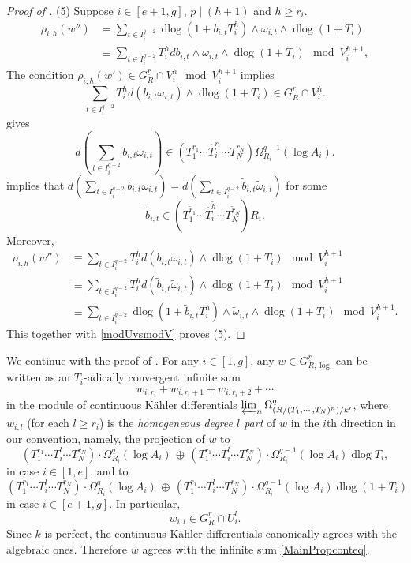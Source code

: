 \documentclass[11pt]{amsart}
\newcommand{\eq}[2]{\begin{equation}\label{#1}#2 \end{equation}}
\renewcommand{\lim}{\operatornamewithlimits{\varprojlim}}
\newcommand{\dlog}{\operatorname{dlog}}
\renewcommand{\hat}{\widehat}
\newcommand{\ul}{\underline}
\renewcommand{\tilde}{\widetilde}
\theoremstyle{plain}
\theoremstyle{definition}
\numberwithin{equation}{prop}
\begin{document}
\begin{proof}[Proof of ]
\vspace{0.5em}
(5)
Suppose $i\in [e+1,g]$,  $p\mid (h+1)$ and $h\ge r_i$.
\begin{align*} 
\rho_{i,h}(w'')
&=
\sum_{t\in I_i^{q-2}} 
\dlog(1+b_{i,t}T_i^{h})\wedge\omega_{i,t}
\wedge \dlog (1+T_i)
\\
&\equiv
\sum_{t\in I_i^{q-2}} 
T_i^{h}db_{i,t}\wedge\omega_{i,t}
\wedge \dlog (1+T_i)
\mod V_i^{h+1},
\end{align*}
The condition
$\rho_{i,h}(w')\in G_R^{\ul r}\cap V_i^{h}\mod V_i^{h+1}$ implies 
$$\sum_{t\in I_i^{q-2}} 
T_i^{h}d(b_{i,t}\omega_{i,t})
\wedge \dlog (1+T_i)
\in G_R^{\ul r}\cap V_i^{h}.$$
 gives
\eq{lem4(5)-1}{
d(\sum_{t\in I_i^{q-2}} b_{i,t}\omega_{i,t})
\in (T_1^{r_1}\cdots\hat T_i^{r_i}\cdots  T_N^{r_N})\Omega^{q-1}_{R_i}(\log A_i).}
 implies that $d(\sum_{t\in I_i^{q-2}} b_{i,t}\omega_{i,t})=d(\sum_{t\in I_i^{q-2}} \tilde b_{i,t}\tilde \omega_{i,t})$ for some 
$$\tilde b_{i,t}\in 
(T_1^{\tilde r_1}\cdots\hat T_i^{\tilde h}\cdots T_N^{\tilde r_N}) R_i.
$$
Moreover,
\begin{align*} 
\rho_{i,h}(w'')&
\equiv
\sum_{t\in I_i^{q-2}} 
T_i^{h}d(b_{i,t}\omega_{i,t})
\wedge \dlog (1+T_i)
\mod V_i^{h+1}
\\
&\equiv
\sum_{t\in I_i^{q-2}} 
T_i^{h}d(\tilde b_{i,t}\tilde \omega_{i,t})
\wedge \dlog (1+T_i)
\mod V_i^{h+1}
\\
&\equiv 
\sum_{t\in I_i^{q-2}} 
\dlog(1+\tilde b_{i,t}T_i^{h})\wedge\tilde \omega_{i,t}
\wedge \dlog (1+T_i)
\mod V_i^{h+1}.
\end{align*}
This together with \eqref{modUvsmodV} proves (5).
\end{proof}










We continue with the proof of .
For any $i\in [1,g]$, any $w\in G^{\ul r}_{R,\log}$  can be written as an $T_i$-adically convergent infinite sum 
\eq{MainPropconteq}{w_{i,r_i}+w_{i,r_i+1}+w_{i,r_i+2}+\cdots}
in the module of continuous K\"ahler differentials $\lim_n \Omega^q_{(R/(T_1,\cdots ,T_N)^n)/k'}$,
where $w_{i,l}$ (for each $l\ge r_i$) is the \textit{homogeneous degree $l$ part} of $w$ in the $i$th direction in our convention, namely,
the projection of $w$ to
$$ 
(T_1^{r_1}\cdots T_i^{l}\cdots T_N^{r_N})\cdot
\Omega^q_{R_i}(\log A_i)\,\oplus \,
(T_1^{r_1}\cdots T_i^{l}\cdots T_N^{r_N})\cdot
\Omega^{q-1}_{R_i}(\log A_i)\dlog T_i,
$$
in case $i\in [1,e]$, and to
$$ 
(T_1^{r_1}\cdots T_i^{l}\cdots T_N^{r_N})\cdot
\Omega^q_{R_i}(\log A_i)\,\oplus \,
(T_1^{r_1}\cdots T_i^{l}\cdots T_N^{r_N})\cdot
\Omega^{q-1}_{R_i}(\log A_i)\dlog (1+T_i)
$$
in case $i\in [e+1,g]$.
In particular,
$$w_{i,l}\in  G_R^{\ul r}\cap U_i^{l}.$$
Since $k$ is perfect, the continuous K\"ahler differentials canonically agrees with the algebraic ones. 
Therefore $w$ agrees with the infinite sum \eqref{MainPropconteq}.
\end{document}
